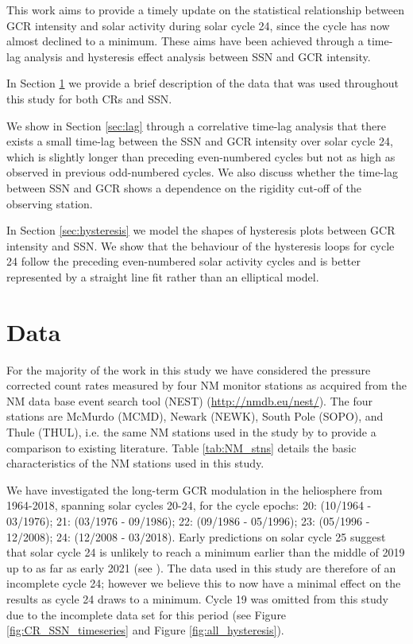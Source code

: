 This work aims to provide a timely update on the statistical relationship between GCR intensity and solar activity during solar cycle 24, since the cycle has now almost declined to a minimum. These aims have been achieved through a time-lag analysis and hysteresis effect analysis between SSN and GCR intensity.

In Section \ref{S-Data} we provide a brief description of the data that was used throughout this study for both CRs and SSN.

We show in Section \ref{sec:lag} through a correlative time-lag analysis that there exists a small time-lag between the SSN and GCR intensity over solar cycle 24, which is slightly longer than preceding even-numbered cycles but not as high as observed in previous odd-numbered cycles. We also discuss whether the time-lag between SSN and GCR shows a dependence on the rigidity cut-off of the observing station. 

In Section \ref{sec:hysteresis} we model the shapes of hysteresis plots between GCR intensity and SSN. We show that the behaviour of the hysteresis loops for cycle 24 follow the preceding even-numbered solar activity cycles and is better represented by a straight line fit rather than an elliptical model.


\section{Data}
\label{S-Data} 

For the majority of the work in this study we have considered the pressure corrected count rates measured by four NM monitor stations as acquired from the NM data base \citep{nmdb_nmdb_nodate} event search tool (NEST) (\url{http://nmdb.eu/nest/}). The four stations are McMurdo (MCMD), Newark (NEWK), South Pole (SOPO), and Thule (THUL), i.e. the same NM stations used in the study by \citet{inceoglu_modeling_2014} to provide a comparison to existing literature. Table \ref{tab:NM_stns} details the basic characteristics of the NM stations used in this study. 

We have investigated the long-term GCR modulation in the heliosphere from 1964-2018, spanning solar cycles 20-24, for the cycle epochs: 20: (10/1964 - 03/1976); 21: (03/1976 - 09/1986); 22: (09/1986 - 05/1996); 23: (05/1996 - 12/2008); 24: (12/2008 - 03/2018). Early predictions on solar cycle 25 suggest that solar cycle 24 is unlikely to reach a minimum earlier than the middle of 2019 up to as far as early 2021 (see \cite{howe_signatures_2018, upton_updated_2018, pesnell_early_2018}). The data used in this study are therefore of an incomplete cycle 24; however we believe this to now have a minimal effect on the results as cycle 24 draws to a minimum. Cycle 19 was omitted from this study due to the incomplete data set for this period (see Figure \ref{fig:CR_SSN_timeseries} and Figure \ref{fig:all_hysteresis}). 


